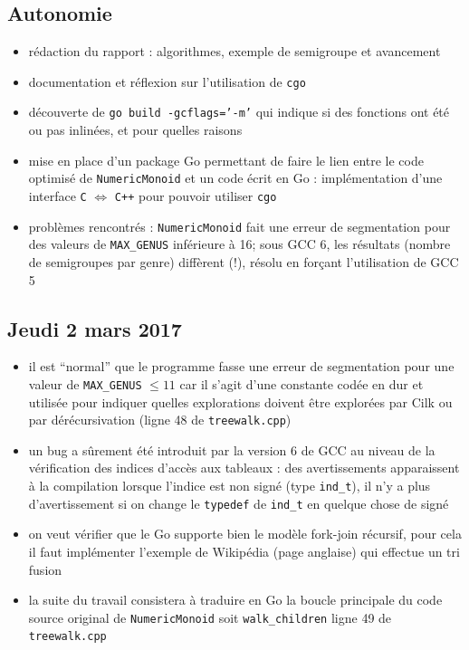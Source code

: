 \documentclass[12pt,a4paper]{report}
\let\leq\leqslant
\begin{document}
\subsection*{Autonomie}
\begin{itemize}
	\item	rédaction du rapport : algorithmes, exemple de semigroupe et avancement
	\item	documentation et réflexion sur l'utilisation de \texttt{cgo}
	\item	découverte de \texttt{go build -gcflags='-m'} qui indique si des fonctions ont été ou pas inlinées, et pour quelles raisons
	\item	mise en place d'un package Go permettant de faire le lien entre le code optimisé de \texttt{NumericMonoid} et un code écrit en Go : implémentation d'une interface \texttt{C} $\Leftrightarrow$ \texttt{C++} pour pouvoir utiliser \texttt{cgo}
	\item	problèmes rencontrés : \texttt{NumericMonoid} fait une erreur de segmentation pour des valeurs de \texttt{MAX\_GENUS} inférieure à 16; sous GCC 6, les résultats (nombre de semigroupes par genre) diffèrent (!), résolu en forçant l'utilisation de GCC 5
\end{itemize}

\subsection*{Jeudi 2 mars 2017}
\begin{itemize}
	\item	il est ``normal'' que le programme fasse une erreur de segmentation pour une valeur de \texttt{MAX\_GENUS} $\leq 11$ car il s'agit d'une constante codée en dur et utilisée pour indiquer quelles explorations doivent être explorées par Cilk ou par dérécursivation (ligne 48 de \texttt{treewalk.cpp})
	\item	un bug a sûrement été introduit par la version 6 de GCC au niveau de la vérification des indices d'accès aux tableaux : des avertissements apparaissent à la compilation lorsque l'indice est non signé (type \texttt{ind\_t}), il n'y a plus d'avertissement si on change le \texttt{typedef} de \texttt{ind\_t} en quelque chose de signé
	\item	on veut vérifier que le Go supporte bien le modèle fork-join récursif, pour cela il faut implémenter l'exemple de Wikipédia (page anglaise) qui effectue un tri fusion
	\item	la suite du travail consistera à traduire en Go la boucle principale du code source original de \texttt{NumericMonoid} soit \texttt{walk\_children} ligne 49 de \texttt{treewalk.cpp}
\end{itemize}
\end{document}
